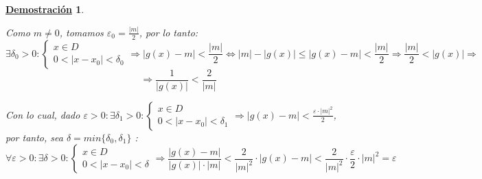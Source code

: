 \documentclass[10pt,a4paper,openright]{book}
\theoremstyle{break}
\newtheorem*{demo}{\underline{Demostración}}
\begin{document}
\begin{demo}
\begin{enumerate}
Como $m\neq 0$, tomamos $\varepsilon_0=\frac{|m|}{2}$, por lo tanto:
$$\exists \delta_0>0: \begin{cases} x\in D\\ 0<|x-x_0|<\delta_0\end{cases}\Rightarrow |g(x)-m|<\frac{|m|}{2}\Leftrightarrow |m|-|g(x)|\leq |g(x)-m|<\frac{|m|}{2} \Rightarrow \frac{|m|}{2}<|g(x)|\Rightarrow$$
$$\Rightarrow \frac{1}{|g(x)|}<\frac{2}{|m|}$$

Con lo cual, dado $\varepsilon>0: \exists \delta_1>0: \begin{cases} x\in D\\ 0<|x-x_0|<\delta_1\end{cases}\Rightarrow |g(x)-m|<\frac{\varepsilon\cdot |m|^2}{2}$, por tanto, sea $\delta=min\{\delta_0, \delta_1\}$ :
$$\forall \varepsilon>0: \exists \delta>0: \begin{cases} x\in D\\ 0<|x-x_0|<\delta\end{cases}\Rightarrow \frac{|g(x)-m|}{|g(x)|\cdot |m|}<\frac{2}{|m|^2}\cdot |g(x)-m|<\frac{2}{|m|^2}\cdot \frac{\varepsilon}{2}\cdot |m|^2=\varepsilon$$
\end{enumerate}
\end{demo}
\end{document}
